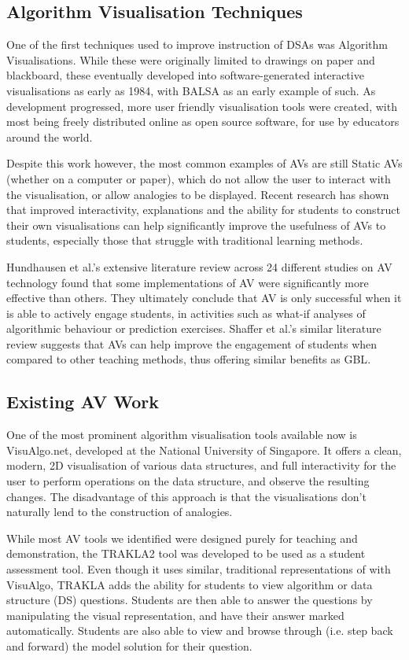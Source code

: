 \documentclass[11pt]{article}
\begin{document}
\subsection{Algorithm Visualisation Techniques}
One of the first techniques used to improve instruction of DSAs was Algorithm Visualisations. While these were originally limited to drawings on paper and blackboard, these eventually developed into software-generated interactive visualisations as early as 1984, with BALSA\cite{Brown:1984:SAA:964965.808596} as an early example of such. As development progressed, more user friendly visualisation tools were created, with most being freely distributed online as open source software, for use by educators around the world.\par
Despite this work however, the most common examples of AVs are still Static AVs (whether on a computer or paper), which do not allow the user to interact with the visualisation, or allow analogies to be displayed. Recent research has shown that improved interactivity, explanations and the ability for students to construct their own visualisations can help significantly improve the usefulness of AVs to students, especially those that struggle with traditional learning methods\cite{vegh2}\cite{Stasko:1993:AAA:169059.169078}.\par
Hundhausen et al.'s extensive literature review across 24 different studies on AV technology found that some implementations of AV were significantly more effective than others\cite{metaStudy}. They ultimately conclude that AV is only successful when it is able to actively engage students, in activities such as what-if analyses of algorithmic behaviour or prediction exercises. Shaffer et al.'s similar literature review suggests that AVs can help improve the engagement of students when compared to other teaching methods, thus offering similar benefits as GBL\cite{Shaffer:2010:AVS:1821996.1821997}.
\subsection{Existing AV Work}
One of the most prominent algorithm visualisation tools available now is VisuAlgo.net\cite{visualgo}, developed at the National University of Singapore. It offers a clean, modern, 2D visualisation of various data structures, and full interactivity for the user to perform operations on the data structure, and observe the resulting changes. The disadvantage of this approach is that the visualisations don't naturally lend to the construction of analogies.\par
While most AV tools we identified were designed purely for teaching and demonstration, the TRAKLA2\cite{TRAKLA2} tool was developed to be used as a student assessment tool. Even though it uses similar, traditional representations of with VisuAlgo, TRAKLA adds the ability for students to view algorithm or data structure (DS) questions. Students are then able to answer the questions by manipulating the visual representation, and have their answer marked automatically. Students are also able to view and browse through (i.e. step back and forward) the model solution for their question.
\end{document}

